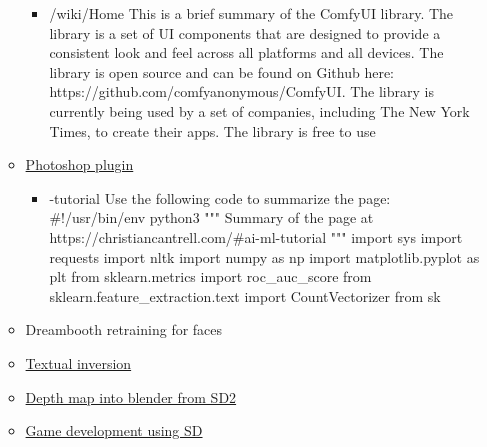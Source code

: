 \begin{itemize}
\begin{itemize}
\begin{itemize}
    \item
      /wiki/Home This is a brief summary of the ComfyUI library. The
      library is a set of UI components that are designed to provide a
      consistent look and feel across all platforms and all devices. The
      library is open source and can be found on Github here:
      https://github.com/comfyanonymous/ComfyUI. The library is
      currently being used by a set of companies, including The New York
      Times, to create their apps. The library is free to use
    \end{itemize}
  \item
    \href{https://christiancantrell.com/\#ai-ml}{Photoshop plugin}

    \begin{itemize}
    
    \item
      -tutorial Use the following code to summarize the page:
      \#!/usr/bin/env python3 """ Summary of the page at
      https://christiancantrell.com/\#ai-ml-tutorial """ import sys
      import requests import nltk import numpy as np import
      matplotlib.pyplot as plt from sklearn.metrics import
      roc\_auc\_score from sklearn.feature\_extraction.text import
      CountVectorizer from sk
    \end{itemize}
  \item
    Dreambooth retraining for faces
  \item
    \href{https://www.reddit.com/r/StableDiffusion/comments/10gs4s2/new_expert_tutorial_for_textual_inversion_text/}{Textual
    inversion}
  \item
    \href{https://www.youtube.com/watch?v=AeDngG9kQNI}{Depth map into
    blender from SD2}
  \item
    \href{https://www.heroo.ai/}{Game development using SD}

    \begin{itemize}
    

\end{itemize}
\end{itemize}
\end{itemize}
